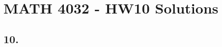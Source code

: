 \documentclass[a4paper,12pt]{article}
\begin{document}
\section*{MATH 4032 - HW10 Solutions}
\subsection*{10.}
\begin{enumerate}

\end{enumerate}
\end{document}
